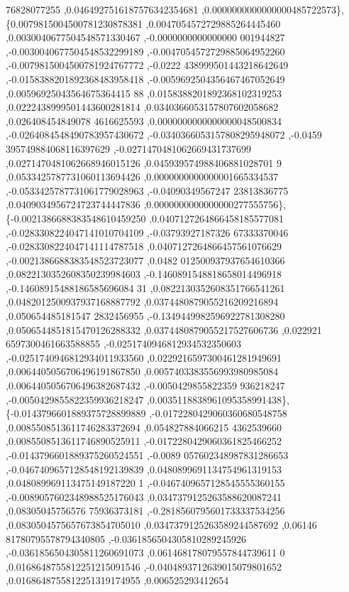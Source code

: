\begin{DoxyCode}
      76828077255 ,0.0464927516187576342354681 ,0.0000000000000000485722573\},
\{0.0079815004500781230878381 ,0.0047054572729885264445460 ,0.0030040677504548571330467 ,-0.0000000000000000
      001944827 ,-0.0030040677504548532299189 ,-0.0047054572729885064952260 ,-0.0079815004500781924767772 ,-0.0222
      438999501443218642649 ,-0.0158388201892368483958418 ,-0.0059692504356467467052649 ,0.00596925043564675364415
      88 ,0.0158388201892368102319253 ,0.0222438999501443600281814 ,0.0340366053157807602058682 ,0.026408454849078
      4616625593 ,0.0000000000000000048500834 ,-0.0264084548490783957430672 ,-0.0340366053157808295948072 ,-0.0459
      395749884068116397629 ,-0.0271470481062669431737699 ,0.0271470481062668946015126 ,0.045939574988406881028701
      9 ,0.0533425787731060113694426 ,0.0000000000000001665334537 ,-0.0533425787731061779028963 ,-0.04090349567247
      23813836775 ,0.0409034956724723744447836 ,0.0000000000000000277555756\},
\{-0.0021386688383548610459250 ,0.0407127264866458185577081 ,-0.0283308224047141010704109 ,-0.03793927187326
      67333370046 ,-0.0283308224047141114787518 ,0.0407127264866457561076629 ,-0.0021386688383548523723077 ,0.0482
      012500937937654610366 ,0.0822130352608350239984603 ,-0.1460891548818658014496918 ,-0.14608915488186585696084
      31 ,0.0822130352608351766541261 ,0.0482012500937937168887792 ,0.0374480879055216209216894 ,0.050654485181547
      2832456955 ,-0.1349449982596922781308280 ,0.0506544851815470126288332 ,0.0374480879055217527606736 ,0.022921
      6597300461663588855 ,-0.0251740946812934532350603 ,-0.0251740946812934011933560 ,0.0229216597300461281949691
       ,0.0064405056706496191867850 ,0.0057403383556993980985084 ,0.0064405056706496382687432 ,-0.0050429855822359
      936218247 ,-0.0050429855822359936218247 ,0.0035118838961095358991438\},
\{-0.0143796601889375728899889 ,-0.0172280429060360680548758 ,0.0085508513611746283372694 ,0.054827884066215
      4362539660 ,0.0085508513611746890525911 ,-0.0172280429060361825466252 ,-0.0143796601889375260524551 ,-0.0089
      057602348987831286653 ,-0.0467409657128548192139839 ,0.0480899691134754961319153 ,0.048089969113475149187220
      1 ,-0.0467409657128545555360155 ,-0.0089057602348988525176043 ,0.0347379125263588620087241 ,0.08305045756576
      75936373181 ,-0.2818560795601733337534256 ,0.0830504575657673854705010 ,0.0347379125263589244587692 ,0.06146
      81780795578794340805 ,-0.0361856504305810289245926 ,-0.0361856504305811260691073 ,0.061468178079557844739611
      0 ,0.0168648755812251215091546 ,-0.0404893712639015079801652 ,0.0168648755812251319174955 ,0.006525293412654

\end{DoxyCode}
